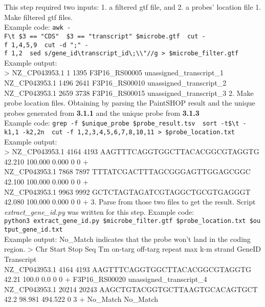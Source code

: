 \documentclass[
]{article}
\begin{document}
This step required two inputs: 1. a filtered gtf file, and 2. a probes'
location file 1. Make filtered gtf files.\\
Example code:
\texttt{awk\ -F\textquotesingle{}\textbackslash{}t\textquotesingle{}\ \textquotesingle{}\$3\ ==\ "CDS"\ \textbar{}\textbar{}\ \$3\ ==\ "transcript"\textquotesingle{}\ \$microbe.gtf\ \textbar{}\ cut\ -f\ 1,4,5,9\ \textbar{}\ cut\ -d\ ";"\ -f\ 1,2\ \textbar{}\ sed\ \textquotesingle{}s/gene\_id\textbackslash{}\textbar{}transcript\_id\textbackslash{}\textbar{};\textbackslash{}\textbar{}\textbackslash{}"//g\textquotesingle{}\ \textgreater{}\ \$microbe\_filter.gtf}\\
Example output:\\
\textgreater{} NZ\_CP043953.1 1 1395 F3P16\_RS00005
unassigned\_transcript\_1\\
NZ\_CP043953.1 1496 2641 F3P16\_RS00010 unassigned\_transcript\_2\\
NZ\_CP043953.1 2659 3738 F3P16\_RS00015 unassigned\_transcript\_3 2.
Make probe location files. Obtaining by parsing the PaintSHOP result and
the unique probes generated from \textbf{3.1.1} and the unique probe
from \textbf{3.1.3}\\
Example code:
\texttt{grep\ -f\ \$unique\_probe\ \$probe\_result.tsv\ \textbar{}\ sort\ -t\$\textquotesingle{}\textbackslash{}t\textquotesingle{}\ -k1,1\ -k2,2n\ \textbar{}\ cut\ -f\ 1,2,3,4,5,6,7,8,10,11\ \textgreater{}\ \$probe\_location.txt}
Example output:\\
\textgreater{} NZ\_CP043953.1 4164 4193 AAGTTTCAGGTGGCTTACACGGCGTAGGTG
42.210 100.000 0.000 0 0 +\\
NZ\_CP043953.1 7868 7897 TTTATCGACTTTAGCGGGAGTTGGAGCGGC 42.100 100.000
0.000 0 0 +\\
NZ\_CP043953.1 9963 9992 GCTCTAGTAGATCGTAGGCTGCGTGAGGGT 42.080 100.000
0.000 0 0 + 3. Parse from those two files to get the result. Script
\emph{extract\_gene\_id.py} was written for this step. Example code:
\texttt{python3\ extract\_gene\_id.py\ \$microbe\_filter.gtf\ \$probe\_location.txt\ \$output\_gene\_id.txt}\\
Example output: No\_Match indicates that the probe won't land in the
coding region. \textgreater{} Chr Start Stop Seq Tm on-targ off-targ
repeat max k-m strand GeneID Transcript\\
NZ\_CP043953.1 4164 4193 AAGTTTCAGGTGGCTTACACGGCGTAGGTG 42.21 100.0 0.0
0 0 + F3P16\_RS00020 unassigned\_transcript\_4\\
NZ\_CP043953.1 20214 20243 AAGCTGTACGGTGCTTAAGTGCACAGTGCT 42.2 98.981
494.522 0 3 + No\_Match No\_Match
\end{document}
